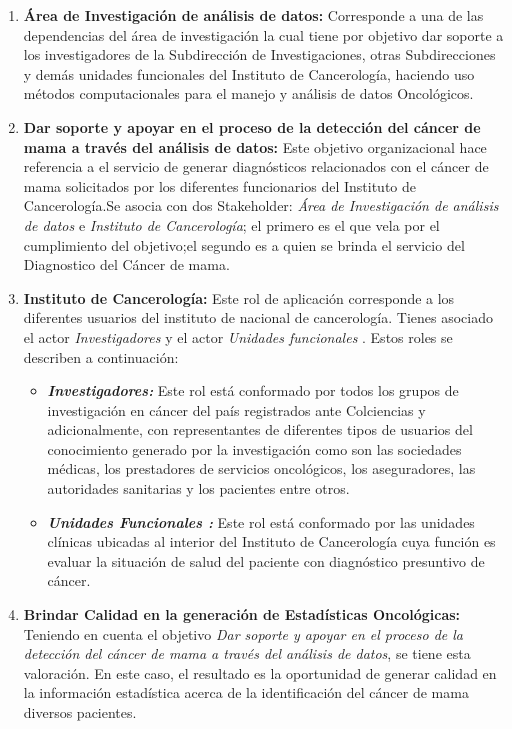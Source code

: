 \begin{enumerate}[label=\textbf{\arabic*})]
	

\item  \textbf{Área de Investigación de análisis de datos:} Corresponde a una de las dependencias del área de investigación la cual  tiene por objetivo dar soporte a los investigadores de la Subdirección de Investigaciones, otras Subdirecciones y demás unidades funcionales del Instituto de Cancerología, haciendo uso métodos computacionales para el manejo y análisis de datos Oncológicos.
	
\item  \textbf{Dar soporte y apoyar en el proceso de la detección del cáncer de mama a través del análisis de datos:} Este objetivo organizacional hace referencia a el servicio de generar diagnósticos relacionados con el cáncer de mama  solicitados por los diferentes funcionarios del Instituto de Cancerología.Se asocia con dos Stakeholder: \textit{Área de Investigación de análisis de datos} e \textit{Instituto de Cancerología}; el primero es el que vela por el cumplimiento del objetivo;el segundo es a quien se brinda el servicio del Diagnostico del Cáncer de mama. 

\item  \textbf{Instituto de Cancerología:} Este rol de aplicación corresponde a los diferentes usuarios del instituto de nacional de cancerología. Tienes asociado el actor \textit{Investigadores} y el actor \textit{Unidades funcionales }. Estos roles se describen a continuación: 
\begin{itemize}
	\item  \textbf{\textit{Investigadores:}}  Este rol está conformado por todos los grupos de investigación en cáncer del país registrados ante Colciencias y adicionalmente, con representantes de diferentes tipos de usuarios del conocimiento generado por la investigación como son las sociedades médicas, los prestadores de servicios oncológicos, los aseguradores, las autoridades sanitarias y los pacientes entre otros. 
	
	\item  \textbf{\textit{Unidades Funcionales :}}  Este rol está conformado por las unidades clínicas ubicadas al interior del Instituto de Cancerología cuya función es evaluar la situación de salud del paciente con diagnóstico presuntivo de cáncer. 
\end{itemize}

\item  \textbf{Brindar Calidad en la generación de Estadísticas Oncológicas:} Teniendo en cuenta el objetivo \textit{Dar soporte y apoyar en el proceso de la detección del cáncer de mama a través del análisis de datos}, se tiene esta valoración. En este caso, el resultado es la oportunidad de generar calidad en la información estadística acerca de la identificación del cáncer de mama diversos pacientes.


\end{enumerate}

